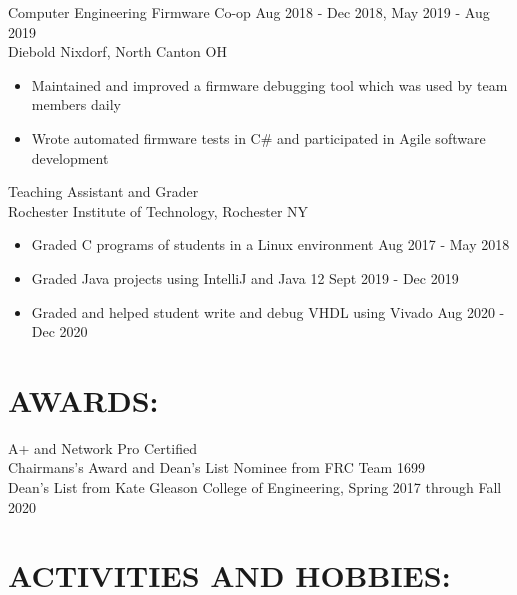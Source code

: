 \documentclass[line,margin]{res}
\newcommand{\SECTIONOFFSET}{-3.6pt}
\newcommand{\ITEMOFFSET}{-8pt}
\begin{document}
\begin{resume}
		Computer Engineering Firmware Co-op \hfill Aug 2018 - Dec 2018, May 2019 - Aug 2019\\
		Diebold Nixdorf, North Canton OH
		\begin{itemize}
			\item Maintained and improved a firmware debugging tool which was used by team members daily
			\item Wrote automated firmware tests in C\# and participated in Agile software development
		\end{itemize}
		\vspace{\ITEMOFFSET}

		Teaching Assistant and Grader\\
		Rochester Institute of Technology, Rochester NY
		\begin{itemize}
			\item Graded C programs of students in a Linux environment \hfill Aug 2017 - May 2018
			\item Graded Java projects using IntelliJ and Java 12 \hfill Sept 2019 - Dec 2019
			\item Graded and helped student write and debug VHDL using Vivado \hfill Aug 2020 - Dec 2020
		\end{itemize}

		\vspace{\SECTIONOFFSET}

	\section{AWARDS:}

		A+ and Network Pro Certified \\
		Chairmans's Award and Dean's List Nominee from FRC Team 1699 \\
		Dean's List from Kate Gleason College of Engineering, Spring 2017 through Fall 2020
		
		\vspace{\SECTIONOFFSET}

	\section{ACTIVITIES AND HOBBIES:}


\end{resume}
\end{document}
